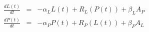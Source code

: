 
\begin{eqnarray*}
  \frac{dL(t)}{dt} &=& -\alpha_{L}L(t) + R_{L}(P(t)) + \beta_{L}A_{P} \\
  \frac{dP(t)}{dt} &=& -\alpha_{P}P(t) + R_{P}(L(t)) + \beta_{P}A_{L}
\end{eqnarray*}
